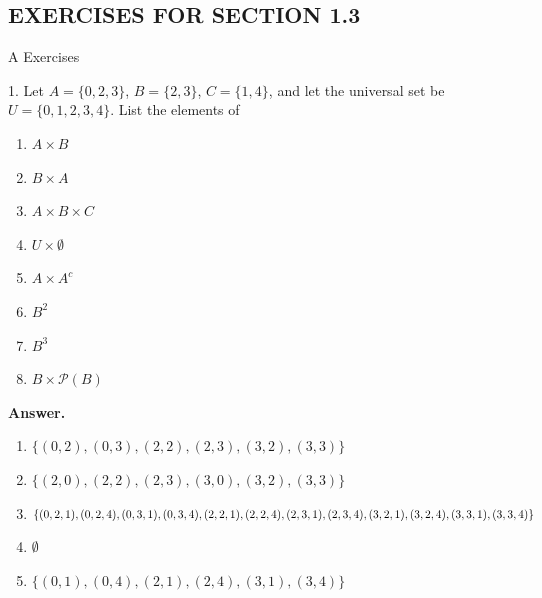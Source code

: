 \documentclass[10pt,]{book}
\theoremstyle{plain}
\theoremstyle{definition}
\theoremstyle{definition}
\theoremstyle{definition}
\theoremstyle{definition}
\begin{document}
\subsection[EXERCISES FOR SECTION 1.3 ]{EXERCISES FOR SECTION 1.3 }\label{exercises-1.3}
\hypertarget{exercisegroup-5}{}\typeout{************************************************}
\typeout{************************************************}
A Exercises%
\begin{exercisegroup}
\item[1.]\hypertarget{exercise-15}{} Let \(A = \{0, 2, 3\}\), \(B = \{2, 3\}\), \(C = \{1, 4\}\), and let the universal set be \(U = \{0, 1, 2, 3, 4\}\). List the elements of %
\par
\leavevmode%
\begin{multicols}{2}
\begin{enumerate}[label=\alph*]
\item\hypertarget{li-139}{}  \(A \times B\) %
\item\hypertarget{li-140}{}  \(B \times  A\) %
\item\hypertarget{li-141}{}  \(A \times B\times C\) %
\item\hypertarget{li-142}{}  \(U \times \emptyset\)%
\item\hypertarget{li-143}{}  \(A \times  A^c\)%
\item\hypertarget{li-144}{}  \(B^2\) %
\item\hypertarget{li-145}{}  \(B^3\)%
\item\hypertarget{li-146}{}  \(B\times \mathcal{P}(B)\)%
\end{enumerate}
\end{multicols}
%
\par\smallskip
\par\smallskip
\noindent\textbf{Answer.}\hypertarget{answer-8}{}\quad
\leavevmode%
\begin{enumerate}[label=\alph*]
\item\hypertarget{li-147}{} \(\{(0, 2), (0, 3), (2, 2), (2, 3), (3, 2), (3, 3)\}\)%
\item\hypertarget{li-148}{}\(\{(2, 0), (2, 2), (2, 3), (3, 0), (3, 2), (3, 3)\}\)%
\item\hypertarget{li-149}{} \(\{(0, 2, 1), (0, 2, 4), (0, 3, 1), (0, 3, 4), (2, 2, 1), (2, 2, 4),\\ (2, 3, 1), (2, 3, 4), (3, 2, 1), (3, 2, 4), (3, 3, 1), (3, 3, 4)\}\)%
\item\hypertarget{li-150}{}\(\emptyset\)%
\item\hypertarget{li-151}{} \(\{(0, 1), (0, 4), (2, 1), (2, 4), (3, 1), (3, 4)\}\)%

\end{enumerate}
\end{exercisegroup}
\end{document}
